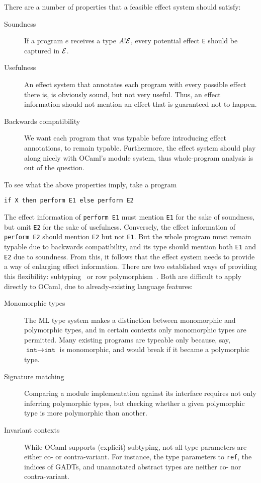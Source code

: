 \documentclass[a4paper,UKenglish]{dagrep}
\begin{document}
There are a number of properties that a feasible effect system should satisfy:
%
\begin{description}
\item[Soundness]
  If a program $e$ receives a type $A ! \mathcal{E}$, every potential effect \verb|E| should be captured in $\mathcal{E}$.
\item[Usefulness]
  An effect system that annotates each program with every possible effect there is,
  is obviously sound, but not very useful. Thus, an effect information should not
  mention an effect that is guaranteed not to happen.
\item[Backwards compatibility]
  We want each program that was typable before introducing effect annotations,
  to remain typable.
  Furthermore, the effect system should play along nicely with OCaml's module system,
  thus whole-program analysis is out of the question.
\end{description}
%
To see what the above properties imply, take a program

\verb|if X then perform E1 else perform E2|

\noindent The effect information of \verb|perform E1|
must mention \verb|E1| for the sake of soundness, but omit \verb|E2| for the sake of usefulness. Conversely, the effect information of \verb|perform E2|
should mention \verb|E2| but not \verb|E1|. But the whole program must remain typable due to backwards compatibility, and its type should mention both \verb|E1| and \verb|E2| due to soundness.
From this, it follows that the effect system needs to provide a way of enlarging effect information.
There are two established ways of providing this flexibility: subtyping~\cite{DBLP:conf/popl/WansbroughJ99} or row polymorphism~\cite{DBLP:journals/corr/Leijen14}. Both are difficult to apply directly to OCaml, due to already-existing language features:
%
\begin{description}
\item[Monomorphic types] The ML type system makes a distinction between monomorphic and polymorphic types, and in certain contexts only monomorphic types are permitted. Many existing programs are typeable only because, say, $\texttt{int} \to \texttt{int}$ is monomorphic, and would break if it became a polymorphic type.
\item[Signature matching] Comparing a module implementation against its interface requires not only inferring polymorphic types, but checking whether a given polymorphic type is more polymorphic than another.
\item[Invariant contexts] While OCaml supports (explicit) subtyping, not all type parameters are either co- or contra-variant. For instance, the type parameters to {\tt ref}, the indices of GADTs, and unannotated abstract types are neither co- nor contra-variant.
\end{description}
\end{document}
